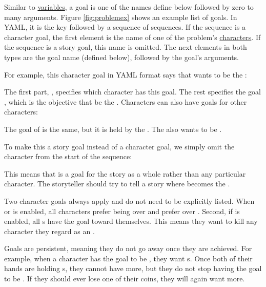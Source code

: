 \documentclass{nilreport}
\begin{document}
Similar to \hyperref[sec:variables]{variables}, a goal is one of the names define below followed by zero to many arguments. Figure \ref{fig:problemex} shows an example list of goals. In YAML, it is the key  followed by a sequence of sequences. If the sequence is a character goal, the first element is the name of one of the problem's \hyperref[sec:characters]{characters}. If the sequence is a story goal, this name is omitted. The next elements in both types are the goal name (defined below), followed by the goal's arguments.

For example, this character goal in YAML format says that  wants  to be the :

\centerline{}

\noindent The first part, , specifies which character has this goal. The rest specifies the goal , which is the objective that  be the . Characters can also have goals for other characters:

\centerline{}

\noindent The goal of  is the same, but it is held by the . The  also wants  to be .

To make this a story goal instead of a character goal, we simply omit the character from the start of the sequence:

\centerline{}

\noindent This means that  is a goal for the story as a whole rather than any particular character. The storyteller should try to tell a story where  becomes the .

Two character goals always apply and do not need to be explicitly listed. When  or  is enabled, all characters prefer being  over  and prefer  over . Second, if  is enabled, all s have the  goal toward themselves. This means they want to kill any character they regard as an .

Goals are persistent, meaning they do not go away once they are achieved. For example, when a character has the goal to be , they want s. Once both of their hands are holding s, they cannot have more, but they do not stop having the goal to be . If they should ever lose one of their coins, they will again want more.
\end{document}
